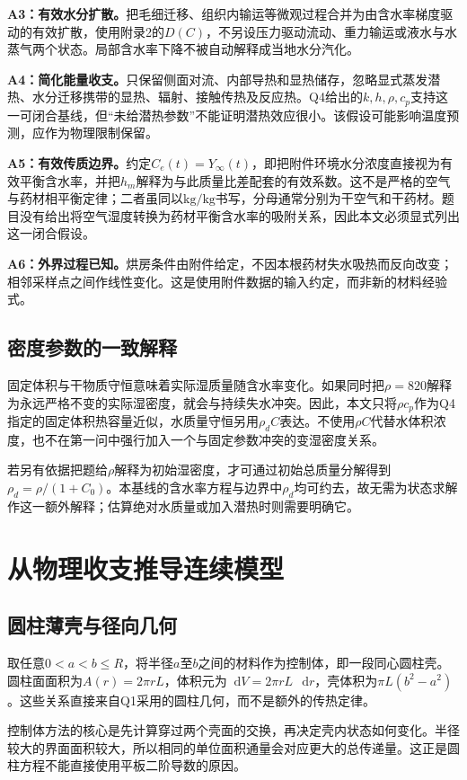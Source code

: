 \documentclass[UTF8,a4paper,zihao=-4,fontset=none]{ctexart}
\numberwithin{equation}{section}
\newcommand{\dd}{\mathop{}\!\mathrm d}
\begin{document}
\textbf{A3：有效水分扩散。}把毛细迁移、组织内输运等微观过程合并为由含水率梯度驱动的有效扩散，使用附录2的$D(C)$，不另设压力驱动流动、重力输运或液水与水蒸气两个状态。局部含水率下降不被自动解释成当地水分汽化。

\textbf{A4：简化能量收支。}只保留侧面对流、内部导热和显热储存，忽略显式蒸发潜热、水分迁移携带的显热、辐射、接触传热及反应热。Q4给出的$k,h,\rho,c_p$支持这一可闭合基线，但“未给潜热参数”不能证明潜热效应很小。该假设可能影响温度预测，应作为物理限制保留。

\textbf{A5：有效传质边界。}约定$C_e(t)=Y_\infty(t)$，即把附件环境水分浓度直接视为有效平衡含水率，并把$h_m$解释为与此质量比差配套的有效系数。这不是严格的空气与药材相平衡定律；二者虽同以$\mathrm{kg/kg}$书写，分母通常分别为干空气和干药材。题目没有给出将空气湿度转换为药材平衡含水率的吸附关系，因此本文必须显式列出这一闭合假设。

\textbf{A6：外界过程已知。}烘房条件由附件给定，不因本根药材失水吸热而反向改变；相邻采样点之间作线性变化。这是使用附件数据的输入约定，而非新的材料经验式。

\subsection{密度参数的一致解释}
固定体积与干物质守恒意味着实际湿质量随含水率变化。如果同时把$\rho=820$解释为永远严格不变的实际湿密度，就会与持续失水冲突。因此，本文只将$\rho c_p$作为Q4指定的固定体积热容量近似，水质量守恒另用$\rho_d C$表达。不使用$\rho C$代替水体积浓度，也不在第一问中强行加入一个与固定参数冲突的变湿密度关系。

若另有依据把题给$\rho$解释为初始湿密度，才可通过初始总质量分解得到$\rho_d=\rho/(1+C_0)$。本基线的含水率方程与边界中$\rho_d$均可约去，故无需为状态求解作这一额外解释；估算绝对水质量或加入潜热时则需要明确它。

\section{从物理收支推导连续模型}
\subsection{圆柱薄壳与径向几何}
取任意$0<a<b\le R$，将半径$a$至$b$之间的材料作为控制体，即一段同心圆柱壳。圆柱面面积为$A(r)=2\pi rL$，体积元为$\dd V=2\pi rL\,\dd r$，壳体积为$\pi L(b^2-a^2)$。这些关系直接来自Q1采用的圆柱几何，而不是额外的传热定律。

控制体方法的核心是先计算穿过两个壳面的交换，再决定壳内状态如何变化。半径较大的界面面积较大，所以相同的单位面积通量会对应更大的总传递量。这正是圆柱方程不能直接使用平板二阶导数的原因。
\end{document}

